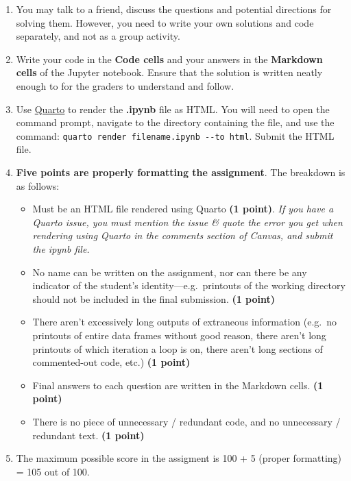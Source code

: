 \documentclass[
  letterpaper,
  DIV=11,
  numbers=noendperiod]{scrreprt}
\providecommand{\tightlist}{%
  \setlength{\itemsep}{0pt}\setlength{\parskip}{0pt}}\usepackage{longtable,booktabs,array}
\begin{document}

\begin{enumerate}
\def\labelenumi{\arabic{enumi}.}
\item
  You may talk to a friend, discuss the questions and potential
  directions for solving them. However, you need to write your own
  solutions and code separately, and not as a group activity.
\item
  Write your code in the \textbf{Code cells} and your answers in the
  \textbf{Markdown cells} of the Jupyter notebook. Ensure that the
  solution is written neatly enough to for the graders to understand and
  follow.
\item
  Use
  \href{https://quarto.org/docs/output-formats/html-basics.html}{Quarto}
  to render the \textbf{.ipynb} file as HTML. You will need to open the
  command prompt, navigate to the directory containing the file, and use
  the command: \texttt{quarto\ render\ filename.ipynb\ -\/-to\ html}.
  Submit the HTML file.
\item
  \textbf{Five points are properly formatting the assignment}. The
  breakdown is as follows:

  \begin{itemize}
  \tightlist
  \item
    Must be an HTML file rendered using Quarto \textbf{(1 point)}.
    \emph{If you have a Quarto issue, you must mention the issue \&
    quote the error you get when rendering using Quarto in the comments
    section of Canvas, and submit the ipynb file.}
  \item
    No name can be written on the assignment, nor can there be any
    indicator of the student's identity---e.g.~printouts of the working
    directory should not be included in the final submission. \textbf{(1
    point)}
  \item
    There aren't excessively long outputs of extraneous information
    (e.g.~no printouts of entire data frames without good reason, there
    aren't long printouts of which iteration a loop is on, there aren't
    long sections of commented-out code, etc.) \textbf{(1 point)}
  \item
    Final answers to each question are written in the Markdown cells.
    \textbf{(1 point)}
  \item
    There is no piece of unnecessary / redundant code, and no
    unnecessary / redundant text. \textbf{(1 point)}
  \end{itemize}
\item
  The maximum possible score in the assigment is 100 + 5 (proper
  formatting) = 105 out of 100.
\end{enumerate}
\end{document}
